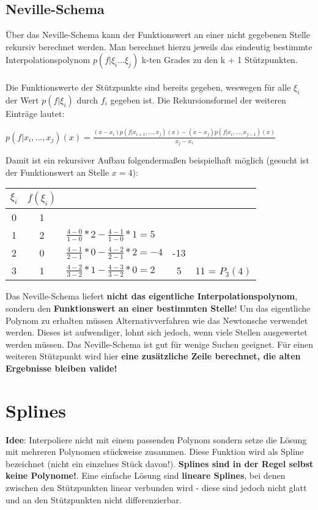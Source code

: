 \documentclass[10pt,a4paper]{article}
\begin{document}
	\subsection{Neville-Schema}
	Über das Neville-Schema kann der Funktionswert an einer nicht gegebenen Stelle rekursiv berechnet werden. Man berechnet hierzu jeweils das eindeutig bestimmte Interpolationspolynom $p(f|\xi_i ... \xi_j)$ k-ten Grades zu den k + 1 Stützpunkten.\\\\ Die Funktionswerte der Stützpunkte sind bereits gegeben, weswegen für alle $\xi_i$ der Wert $p(f|\xi_i)$ durch $f_i$ gegeben ist. Die Rekursionsformel der weiteren Einträge lautet:
	\begin{center}
		$p(f|x_i,...,x_j)(x) = \frac{(x - x_i) p(f|x_{i + 1},...,x_j)(x) - (x - x_j)p(f|x_i,...,x_{j-1})(x)}{x_j - x_i}$
	\end{center}
	Damit ist ein rekursiver Aufbau folgendermaßen beispielhaft möglich (gesucht ist der Funktionswert an Stelle $x = 4$):\\
	\begin{center}
		\begin{tabular}{c | c l c c}
			$\xi_i$ & $f(\xi_i)$ & & &\\
			\hline
			0 & 1 & &\\
			1 & 2 & $\frac{4 - 0}{1 - 0} * 2 - \frac{4 - 1}{1 - 0} * 1 = 5$ & &\\
			2 & 0 & $\frac{4 - 1}{2 - 1} * 0 - \frac{4 - 2}{2 - 1} * 2 = -4$ & -13 &\\
			3 & 1 & $\frac{4 - 2}{3 - 2} * 1 - \frac{4 - 3}{3 - 2} * 0 = 2$ & 5 & 11 = $P_3(4)$
		\end{tabular}
	\end{center}
	Das Neville-Schema liefert \textbf{nicht das eigentliche Interpolationspolynom}, sondern den \textbf{Funktionswert an einer bestimmten Stelle}! Um das eigentliche Polynom zu erhalten müssen Alternativverfahren wie das Newtonsche verwendet werden. Dieses ist aufwendiger, lohnt sich jedoch, wenn viele Stellen ausgewertet werden müssen. Das Neville-Schema ist gut für wenige Suchen geeignet. Für einen weiteren Stützpunkt wird hier \textbf{eine zusätzliche Zeile berechnet, die alten Ergebnisse bleiben valide!}
	\newpage
	\section{Splines}
	\textbf{Idee}: Interpoliere nicht mit einem passenden Polynom sondern setze die Lösung mit mehreren Polynomen stückweise zusammen. Diese Funktion wird als Spline bezeichnet (nicht ein einzelnes Stück davon!). \textbf{Splines sind in der Regel selbst keine Polynome!}. Eine einfache Lösung sind \textbf{lineare Splines}, bei denen zwischen den Stützpunkten linear verbunden wird - diese sind jedoch nicht glatt und an den Stützpunkten nicht differenzierbar.
	
\end{document}
